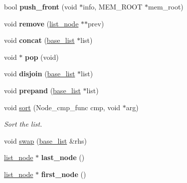 \begin{DoxyCompactItemize}
bool {\bfseries push\+\_\+front} (void $\ast$info, M\+E\+M\+\_\+\+R\+O\+OT $\ast$mem\+\_\+root)
\item 
\mbox{\label{classbase__list_acafc881d265b00261f580b0911601962}} 
void {\bfseries remove} (\mbox{\hyperlink{structlist__node}{list\+\_\+node}} $\ast$$\ast$prev)
\item 
\mbox{\label{classbase__list_a2a0e4f2a67ce14b5f93118ff2f1a9801}} 
void {\bfseries concat} (\mbox{\hyperlink{classbase__list}{base\+\_\+list}} $\ast$list)
\item 
\mbox{\label{classbase__list_a9ceedc9fbf54473ccb50612b5fe0ffa7}} 
void $\ast$ {\bfseries pop} (void)
\item 
\mbox{\label{classbase__list_a1c92e19ba89bc98c61f64c415e84a232}} 
void {\bfseries disjoin} (\mbox{\hyperlink{classbase__list}{base\+\_\+list}} $\ast$list)
\item 
\mbox{\label{classbase__list_ad7d612f8132a1d6643b667a0fbef1cbf}} 
void {\bfseries prepand} (\mbox{\hyperlink{classbase__list}{base\+\_\+list}} $\ast$list)
\item 
void \mbox{\hyperlink{classbase__list_a6248247a8f1560022bfae0327076dc1b}{sort}} (Node\+\_\+cmp\+\_\+func cmp, void $\ast$arg)
\begin{DoxyCompactList}\small\item\em Sort the list. \end{DoxyCompactList}\item 
void \mbox{\hyperlink{classbase__list_a5f4318d70a12a85932c5daacf0015f73}{swap}} (\mbox{\hyperlink{classbase__list}{base\+\_\+list}} \&rhs)
\item 
\mbox{\label{classbase__list_a7b64ad8250cf3bd4e36164d9f24eb9d1}} 
\mbox{\hyperlink{structlist__node}{list\+\_\+node}} $\ast$ {\bfseries last\+\_\+node} ()
\item 
\mbox{\label{classbase__list_ac8fc2be57de00a3b90a3fb3036d0263f}} 
\mbox{\hyperlink{structlist__node}{list\+\_\+node}} $\ast$ {\bfseries first\+\_\+node} ()
\item 
\mbox{\label{classbase__list_adf3b6fd5080d29df05d6157aeddb0b61}} 
$$
\end{DoxyCompactItemize}
